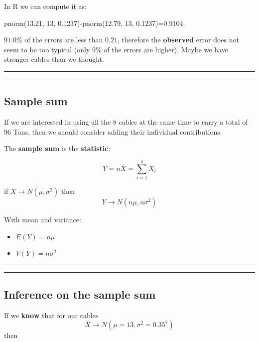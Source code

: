 \documentclass[
]{book}
\providecommand{\tightlist}{%
  \setlength{\itemsep}{0pt}\setlength{\parskip}{0pt}}
\begin{document}
In R we can compute it as:

pnorm(13.21, 13, 0.1237)-pnorm(12.79, 13, 0.1237)=0.9104.

\(91.0\%\) of the errors are less than \(0.21\), therefore the \textbf{observed} error does not seem to be too typical (only \(9\%\) of the errors are higher). Maybe we have stronger cables than we thought.

\begin{center}\rule{0.5\linewidth}{0.5pt}\end{center}

\begin{center}\rule{0.5\linewidth}{0.5pt}\end{center}

\hypertarget{sample-sum}{%
\subsection{Sample sum}\label{sample-sum}}

If we are interested in using all the \(8\) cables at the same time to carry a total of \(96\) Tons, then we should consider adding their individual contributions.

The \textbf{sample sum} is the \textbf{statistic}:

\[Y=n \bar{X}=\sum_{i=1}^n X_i\]

if \(X \rightarrow N(\mu, \sigma^2)\) then \[Y \rightarrow N(n\mu, n\sigma^2)\]

With mean and variance:

\begin{itemize}
\tightlist
\item
  \(E(Y)=n\mu\)
\item
  \(V(Y)=n\sigma^2\)
\end{itemize}

\begin{center}\rule{0.5\linewidth}{0.5pt}\end{center}

\begin{center}\rule{0.5\linewidth}{0.5pt}\end{center}

\hypertarget{inference-on-the-sample-sum}{%
\subsection{Inference on the sample sum}\label{inference-on-the-sample-sum}}

If we \textbf{know} that for our cables \[X \rightarrow N(\mu=13, \sigma^2=0.35^2)\] then
\end{document}
